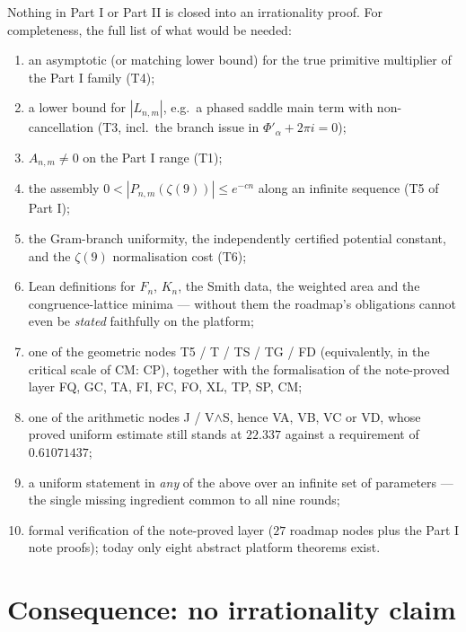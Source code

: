 \documentclass[11pt]{article}
\begin{document}
Nothing in Part I or Part II is closed into an irrationality proof. For completeness, the full list
of what would be needed:

\begin{enumerate}[leftmargin=1.6em]
\item[\textbf{C1}] an asymptotic (or matching lower bound) for the true primitive multiplier of the
      Part I family (T4);
\item[\textbf{C2}] a lower bound for $|L_{n,m}|$, e.g.\ a phased saddle main term with
      non-cancellation (T3, incl.\ the branch issue in $\Phi'_\alpha+2\pi i=0$);
\item[\textbf{C3}] $A_{n,m}\ne0$ on the Part I range (T1);
\item[\textbf{C4}] the assembly $0<|P_{n,m}(\zeta(9))|\le e^{-cn}$ along an infinite sequence (T5 of Part I);
\item[\textbf{C5}] the Gram-branch uniformity, the independently certified potential constant, and
      the $\zeta(9)$ normalisation cost (T6);
\item[\textbf{C6}] Lean definitions for $F_n$, $K_n$, the Smith data, the weighted area and the
      congruence-lattice minima --- without them the roadmap's obligations cannot even be
      \emph{stated} faithfully on the platform;
\item[\textbf{C7}] one of the geometric nodes T5 / T / TS / TG / FD (equivalently, in the critical
      scale of CM: CP), together with the formalisation of the note-proved layer FQ, GC, TA, FI, FC,
      FO, XL, TP, SP, CM;
\item[\textbf{C8}] one of the arithmetic nodes J / V$\wedge$S, hence VA, VB, VC or VD, whose proved
      uniform estimate still stands at $22.337$ against a requirement of $0.61071437$;
\item[\textbf{C9}] a uniform statement in \emph{any} of the above over an infinite set of parameters
      --- the single missing ingredient common to all nine rounds;
\item[\textbf{C10}] formal verification of the note-proved layer ($27$ roadmap nodes plus the Part I
      note proofs); today only eight abstract platform theorems exist.
\end{enumerate}

\section{Consequence: no irrationality claim}
\label{sec:conclusion}
\end{document}
